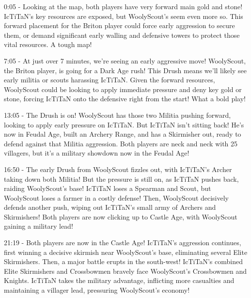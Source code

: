 0:05 - Looking at the map, both players have very forward main gold and stone! IcTiTaN’s key resources are exposed, but WoolyScout’s seem even more so. This forward placement for the Briton player could force early aggression to secure them, or demand significant early walling and defensive towers to protect those vital resources. A tough map! \par \vspace{1em}

7:05 - At just over 7 minutes, we're seeing an early aggressive move! WoolyScout, the Briton player, is going for a Dark Age rush! This Drush means we'll likely see early militia or scouts harassing IcTiTaN. Given the forward resources, WoolyScout could be looking to apply immediate pressure and deny key gold or stone, forcing IcTiTaN onto the defensive right from the start! What a bold play! \par \vspace{1em}

13:05 - The Drush is on! WoolyScout has those two Militia pushing forward, looking to apply early pressure on IcTiTaN. But IcTiTaN isn't sitting back! He's now in Feudal Age, built an Archery Range, and has a Skirmisher out, ready to defend against that Militia aggression. Both players are neck and neck with 25 villagers, but it's a military showdown now in the Feudal Age! \par \vspace{1em}

16:50 - The early Drush from WoolyScout fizzles out, with IcTiTaN's Archer taking down both Militia! But the pressure is still on, as IcTiTaN pushes back, raiding WoolyScout's base! IcTiTaN loses a Spearman and Scout, but WoolyScout loses a farmer in a costly defense! Then, WoolyScout decisively defends another push, wiping out IcTiTaN's small army of Archers and Skirmishers! Both players are now clicking up to Castle Age, with WoolyScout gaining a military lead! \par \vspace{1em}

21:19 - Both players are now in the Castle Age! IcTiTaN's aggression continues, first winning a decisive skirmish near WoolyScout's base, eliminating several Elite Skirmishers. Then, a major battle erupts in the south-west! IcTiTaN's combined Elite Skirmishers and Crossbowmen bravely face WoolyScout's Crossbowmen and Knights. IcTiTaN takes the military advantage, inflicting more casualties and maintaining a villager lead, pressuring WoolyScout's economy! \par \vspace{1em}

